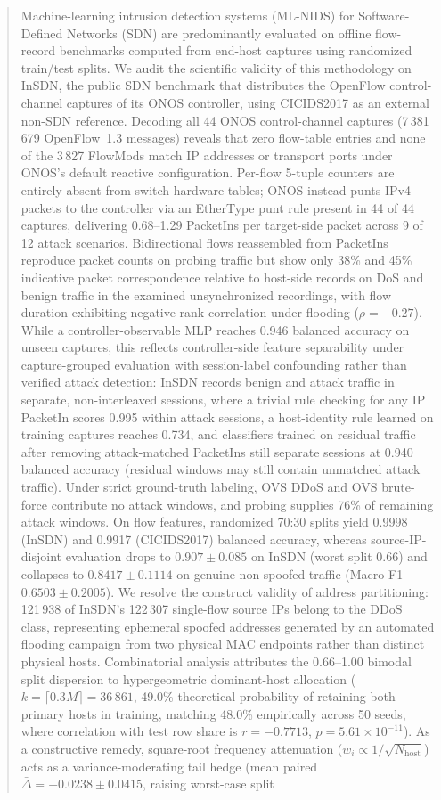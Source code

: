 \documentclass[journal]{IEEEtran}
\begin{document}
\begin{abstract}
Machine-learning intrusion detection systems (ML-NIDS) for Software-Defined Networks (SDN) are predominantly evaluated on offline flow-record benchmarks computed from end-host captures using randomized train/test splits. We audit the scientific validity of this methodology on InSDN, the public SDN benchmark that distributes the OpenFlow control-channel captures of its ONOS controller, using CICIDS2017 as an external non-SDN reference. Decoding all 44 ONOS control-channel captures (7\,381\,679 OpenFlow~1.3 messages) reveals that zero flow-table entries and none of the 3\,827 FlowMods match IP addresses or transport ports under ONOS's default reactive configuration. Per-flow 5-tuple counters are entirely absent from switch hardware tables; ONOS instead punts IPv4 packets to the controller via an EtherType punt rule present in 44 of 44 captures, delivering 0.68--1.29 PacketIns per target-side packet across 9 of 12 attack scenarios. Bidirectional flows reassembled from PacketIns reproduce packet counts on probing traffic but show only 38\% and 45\% indicative packet correspondence relative to host-side records on DoS and benign traffic in the examined unsynchronized recordings, with flow duration exhibiting negative rank correlation under flooding ($\rho=-0.27$). While a controller-observable MLP reaches 0.946 balanced accuracy on unseen captures, this reflects controller-side feature separability under capture-grouped evaluation with session-label confounding rather than verified attack detection: InSDN records benign and attack traffic in separate, non-interleaved sessions, where a trivial rule checking for any IP PacketIn scores 0.995 within attack sessions, a host-identity rule learned on training captures reaches 0.734, and classifiers trained on residual traffic after removing attack-matched PacketIns still separate sessions at 0.940 balanced accuracy (residual windows may still contain unmatched attack traffic). Under strict ground-truth labeling, OVS DDoS and OVS brute-force contribute no attack windows, and probing supplies 76\% of remaining attack windows. On flow features, randomized 70:30 splits yield 0.9998 (InSDN) and 0.9917 (CICIDS2017) balanced accuracy, whereas source-IP-disjoint evaluation drops to $0.907\pm0.085$ on InSDN (worst split 0.66) and collapses to $0.8417\pm0.1114$ on genuine non-spoofed traffic (Macro-F1 $0.6503\pm0.2005$). We resolve the construct validity of address partitioning: 121\,938 of InSDN's 122\,307 single-flow source IPs belong to the DDoS class, representing ephemeral spoofed addresses generated by an automated flooding campaign from two physical MAC endpoints rather than distinct physical hosts. Combinatorial analysis attributes the 0.66--1.00 bimodal split dispersion to hypergeometric dominant-host allocation ($k=\lceil 0.3M \rceil = 36\,861$, 49.0\% theoretical probability of retaining both primary hosts in training, matching 48.0\% empirically across 50 seeds, where correlation with test row share is $r=-0.7713$, $p=5.61\times 10^{-11}$). As a constructive remedy, square-root frequency attenuation ($w_i \propto 1 / \sqrt{N_{\text{host}}}$) acts as a variance-moderating tail hedge (mean paired $\bar{\Delta} = +0.0238\pm0.0415$, raising worst-case split 
\end{abstract}
\end{document}
